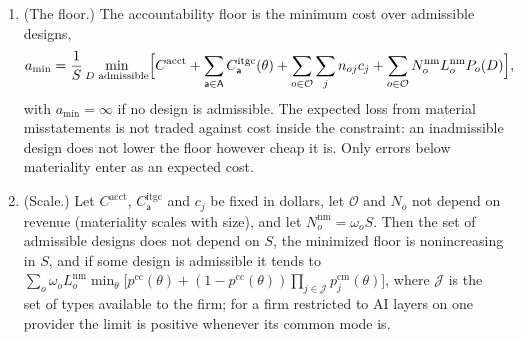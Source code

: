 \begin{proposition}
\begin{enumerate}
\item[(c)] (The floor.) The accountability floor is the minimum cost over admissible designs,
\begin{equation}\label{eq:amin}
a_{\min}=\frac1S\min_{D\text{ admissible}}\Bigl[C^{\mathrm{acct}}+\sum_{\mathsf a\in\mathsf A}C^{\mathrm{itgc}}_{\mathsf a}(\theta)+\sum_{o\in\mathcal O}\sum_jn_{oj}c_j+\sum_{o\in\mathcal O}N^{\mathrm{nm}}_oL^{\mathrm{nm}}_oP_o(D)\Bigr],
\end{equation}
with $a_{\min}=\infty$ if no design is admissible. The expected loss from material misstatements is not traded against cost inside the constraint: an inadmissible design does not lower the floor however cheap it is. Only errors below materiality enter as an expected cost.
\item[(d)] (Scale.) Let $C^{\mathrm{acct}}$, $C^{\mathrm{itgc}}_{\mathsf a}$ and $c_j$ be fixed in dollars, let $\mathcal O$ and $N_o$ not depend on revenue (materiality scales with size), and let $N^{\mathrm{nm}}_o=\omega_oS$. Then the set of admissible designs does not depend on $S$, the minimized floor is nonincreasing in $S$, and if some design is admissible it tends to $\sum_o\omega_oL^{\mathrm{nm}}_o\min_{\theta}\bigl[p^{\mathrm{cc}}(\theta)+(1-p^{\mathrm{cc}}(\theta))\prod_{j\in\mathcal J}p^{\mathrm{cm}}_j(\theta)\bigr]$, where $\mathcal J$ is the set of types available to the firm; for a firm restricted to AI layers on one provider the limit is positive whenever its common mode is.
\end{enumerate}
\end{proposition}

